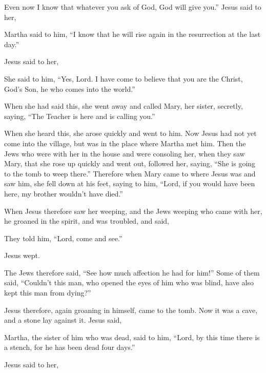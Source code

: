 {Even now I know that whatever you ask of God, God will give you.”
Jesus said to her,
{}
\par }{\PP {}Martha said to him, “I know that he will rise again in the resurrection at the last day.”
\par }{\PP {}Jesus said to her,
{}
\par }{\PP {}She said to him, “Yes, Lord. I have come to believe that you are the Christ, God’s Son, he who comes into the world.”
\par }{\PP {}When she had said this, she went away and called Mary, her sister, secretly, saying, “The Teacher is here and is calling you.”
\par }{\PP {}When she heard this, she arose quickly and went to him.
Now Jesus had not yet come into the village, but was in the place where Martha met him.
Then the Jews who were with her in the house and were consoling her, when they saw Mary, that she rose up quickly and went out, followed her, saying, “She is going to the tomb to weep there.”
Therefore when Mary came to where Jesus was and saw him, she fell down at his feet, saying to him, “Lord, if you would have been here, my brother wouldn’t have died.”
\par }{\PP {}When Jesus therefore saw her weeping, and the Jews weeping who came with her, he groaned in the spirit, and was troubled,
and said,
{}
\par }{\PP They told him, “Lord, come and see.”
\par }{\PP {}Jesus wept.
\par }{\PP {}The Jews therefore said, “See how much affection he had for him!”
Some of them said, “Couldn’t this man, who opened the eyes of him who was blind, have also kept this man from dying?”
\par }{\PP {}Jesus therefore, again groaning in himself, came to the tomb. Now it was a cave, and a stone lay against it.
Jesus said,
{}
\par }{\PP Martha, the sister of him who was dead, said to him, “Lord, by this time there is a stench, for he has been dead four days.”
\par }{\PP {}Jesus said to her,
{}
}
